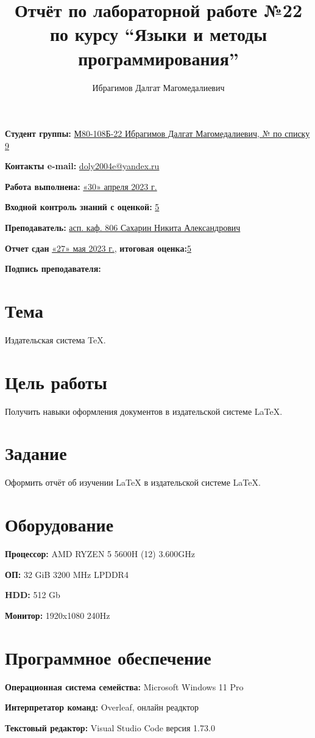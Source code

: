 \documentclass[12pt, letterpaper]{article}
\title{Отчёт по лабораторной работе №22 по курсу “Языки и методы программирования”}
\author{Ибрагимов Далгат Магомедалиевич}
\begin{document}
\maketitle
\begin{description}
\item\textbf{Студент группы:} \underline{М80-108Б-22 Ибрагимов Далгат Магомедалиевич, № по списку 9}    
\item\textbf{Контакты e-mail:} \underline{doly2004e@yandex.ru}
\item\textbf{Работа выполнена:} \underline{«30» апреля 2023 г.}
\item\textbf{Входной контроль знаний с оценкой:} \underline{5}
\item\textbf{Преподаватель:} \underline{асп. каф. 806 Сахарин Никита Александрович}
\item\textbf{Отчет сдан} \underline{«27» мая 2023 г.}, \textbf{итоговая оценка:}\underline{5}
\item\textbf{Подпись преподавателя:} \underline{\hspace{3cm}}
\end{description}
\newpage
\section{Тема}
Издательская система \TeX{}.
\section{Цель работы}
Получить навыки оформления документов в издательской системе \LaTeX{}.
\section{Задание}
Оформить отчёт об изучении \LaTeX{} в издательской системе \LaTeX{}.
\section{Оборудование}
\begin{description}
\item\textbf{Процессор:} AMD RYZEN 5 5600H (12) 3.600GHz
\item\textbf{ОП:} 32 GiB 3200 MHz LPDDR4
\item\textbf{HDD:} 512 Gb
\item\textbf{Монитор:} 1920x1080 240Hz
\end{description}
\section{Программное обеспечение}
\begin{description}
\item\textbf{Операционная система семейства:} Microsoft Windows 11 Pro
\item\textbf{Интерпретатор команд:} Overleaf, онлайн реадктор
\item\textbf{Текстовый редактор:} Visual Studio Code версия 1.73.0
\end{description}
\end{document}
